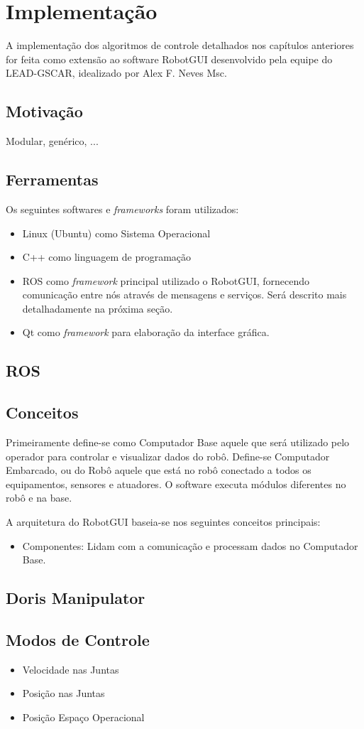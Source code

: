 \chapter{Implementação}
A implementação dos algoritmos de controle detalhados nos capítulos anteriores for feita como extensão ao software RobotGUI desenvolvido pela equipe do LEAD-GSCAR, idealizado por Alex F. Neves Msc. 

\section{Motivação} 
Modular, genérico, ...

\section{Ferramentas}
Os seguintes softwares e \textit{frameworks} foram utilizados:

\begin{itemize}
\item Linux (Ubuntu) como Sistema Operacional
\item C++ como linguagem de programação
\item ROS como \textit{framework} principal utilizado o RobotGUI, fornecendo comunicação entre nós através de mensagens e serviços. Será descrito mais detalhadamente na próxima seção.
\item Qt como \textit{framework} para elaboração da interface gráfica. 
\end{itemize}

\section{ROS}

\section{Conceitos}

Primeiramente define-se como Computador Base aquele que será utilizado pelo operador para controlar e visualizar dados do robô. Define-se Computador Embarcado, ou do Robô aquele que está no robô conectado a todos os equipamentos, sensores e atuadores. O software executa módulos diferentes no robô e na base.

A arquitetura do RobotGUI baseia-se nos seguintes conceitos principais:

\begin{itemize}
\item Componentes: Lidam com a comunicação e processam dados no Computador Base.
\end{itemize}

\section{Doris Manipulator}

\section{Modos de Controle}
\begin{itemize}
\item Velocidade nas Juntas
\item Posição nas Juntas
\item Posição Espaço Operacional
\end{itemize}
